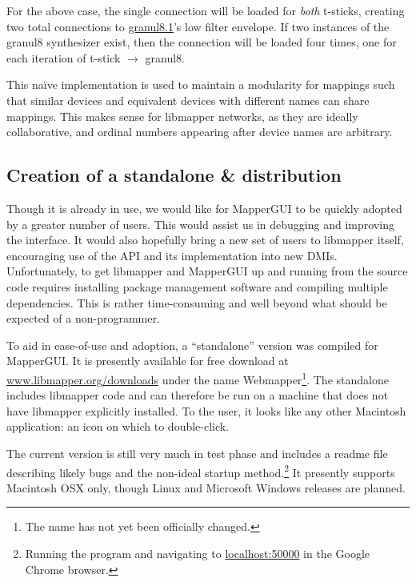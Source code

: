 For the above case, the single connection will be loaded for \emph{both} t-sticks, creating two total connections to \url{granul8.1}'s low filter envelope. If two instances of the granul8 synthesizer exist, then the connection will be loaded four times, one for each iteration of t-stick $\rightarrow$ granul8.

This na\"ive implementation is used to maintain a modularity for mappings such that similar devices and equivalent devices with different names can share mappings. This makes sense for libmapper networks, as they are ideally collaborative, and ordinal numbers appearing after device names are arbitrary. 
	

	\subsection{Creation of a standalone \& distribution} %
	\label{sec:creation_of_a_standalone_and_distribution}
	
Though it is already in use, we would like for MapperGUI to be quickly adopted by a greater number of users. This would assist us in debugging and improving the interface. It would also hopefully bring a new set of users to libmapper itself, encouraging use of the API and its implementation into new DMIs. Unfortunately, to get libmapper and MapperGUI up and running from the source code requires installing package management software and compiling multiple dependencies. This is rather time-consuming and well beyond what should be expected of a non-programmer. 

To aid in ease-of-use and adoption, a ``standalone'' version was compiled for MapperGUI. It is presently available for free download at \url{www.libmapper.org/downloads} under the name Webmapper\footnote{The name has not yet been officially changed.}. The standalone includes libmapper code and can therefore be run on a machine that does not have libmapper explicitly installed. To the user, it looks like any other Macintosh application: an icon on which to double-click.

The current version is still very much in test phase and includes a readme file describing likely bugs and the non-ideal startup method.\footnote{Running the program and navigating to \url{localhost:50000} in the Google Chrome browser.} It presently supports Macintosh OSX only, though Linux and Microsoft Windows releases are planned.


